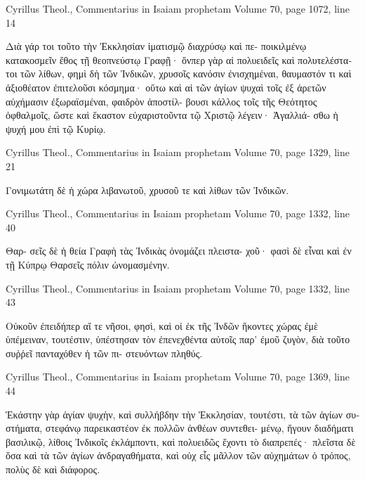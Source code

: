 \documentclass[12pt,letterpaper,twoside,final]{memoir}
\begin{document}
\begin{greek}
Cyrillus Theol., Commentarius in Isaiam prophetam 
Volume 70, page 1072, line 14

                                         Διὰ γάρ τοι 
τοῦτο τὴν Ἐκκλησίαν ἱματισμῷ διαχρύσῳ καὶ πε-
ποικιλμένῳ κατακοσμεῖν ἔθος τῇ θεοπνεύστῳ Γραφῇ· 
ὅνπερ γὰρ αἱ πολυειδεῖς καὶ πολυτελέστατοι τῶν 
λίθων, φημὶ δὴ τῶν Ἰνδικῶν, χρυσοῖς κανόσιν 
ἐνισχημέναι, θαυμαστόν τι καὶ ἀξιοθέατον ἐπιτελοῦσι 
κόσμημα· οὕτω καὶ αἱ τῶν ἁγίων ψυχαὶ τοῖς ἐξ 
ἀρετῶν αὐχήμασιν ἐξωραϊσμέναι, φαιδρὸν ἀποστίλ-
βουσι κάλλος τοῖς τῆς Θεότητος ὀφθαλμοῖς, ὥστε καὶ 
ἕκαστον εὐχαριστοῦντα τῷ Χριστῷ λέγειν· Ἀγαλλιά-
σθω ἡ ψυχή μου ἐπὶ τῷ Κυρίῳ. 



Cyrillus Theol., Commentarius in Isaiam prophetam 
Volume 70, page 1329, line 21

                                              Γονιμωτάτη 
δὲ ἡ χώρα λιβανωτοῦ, χρυσοῦ τε καὶ λίθων τῶν 
Ἰνδικῶν. 



Cyrillus Theol., Commentarius in Isaiam prophetam 
Volume 70, page 1332, line 40

                                                          Θαρ-
σεῖς δὲ ἡ θεία Γραφὴ τὰς Ἰνδικὰς ὀνομάζει πλειστα-
χοῦ· φασὶ δὲ εἶναι καὶ ἐν τῇ Κύπρῳ Θαρσεῖς πόλιν 
ὠνομασμένην. 



Cyrillus Theol., Commentarius in Isaiam prophetam 
Volume 70, page 1332, line 43

               Οὐκοῦν ἐπειδήπερ αἵ τε νῆσοι, φησὶ, 
καὶ οἱ ἐκ τῆς Ἰνδῶν ἥκοντες χώρας ἐμὲ ὑπέμειναν, 
τουτέστιν, ὑπέστησαν τὸν ἐπενεχθέντα αὐτοῖς παρ' 
ἐμοῦ ζυγὸν, διὰ τοῦτο συῤῥεῖ πανταχόθεν ἡ τῶν πι-
στευόντων πληθύς. 



Cyrillus Theol., Commentarius in Isaiam prophetam 
Volume 70, page 1369, line 44

       Ἑκάστην γὰρ ἁγίαν ψυχὴν, καὶ συλλήβδην τὴν 
Ἐκκλησίαν, τουτέστι, τὰ τῶν ἁγίων συστήματα, 
στεφάνῳ παρεικαστέον ἐκ πολλῶν ἀνθέων συντεθει-
μένῳ, ἤγουν διαδήματι βασιλικῷ, λίθοις Ἰνδικοῖς 
ἐκλάμποντι, καὶ πολυειδῶς ἔχοντι τὸ διαπρεπές· 
πλεῖστα δὲ ὅσα καὶ τὰ τῶν ἁγίων ἀνδραγαθήματα, 
καὶ οὐχ εἷς μᾶλλον τῶν αὐχημάτων ὁ τρόπος, πολὺς 
δὲ καὶ διάφορος. 

\end{greek}
\end{document}
